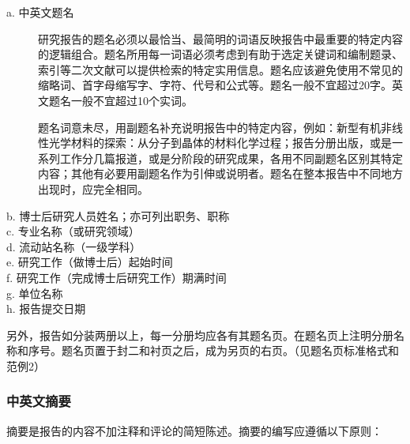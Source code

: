 \begin{description}

\item[a. 中英文题名]

研究报告的题名必须以最恰当、最简明的词语反映报告中最重要的特定内容的逻辑组合。题名所用每一词语必须考虑到有助于选定关键词和编制题录、索引等二次文献可以提供检索的特定实用信息。题名应该避免使用不常见的缩略词、首字母缩写字、字符、代号和公式等。题名一般不宜超过20字。英文题名一般不宜超过10个实词。

题名词意未尽，用副题名补充说明报告中的特定内容，例如：新型有机非线性光学材料的探索：从分子到晶体的材料化学过程；报告分册出版，或是一系列工作分几篇报道，或是分阶段的研究成果，各用不同副题名区别其特定内容；其他有必要用副题名作为引伸或说明者。题名在整本报告中不同地方出现时，应完全相同。

\item[b. 博士后研究人员姓名；亦可列出职务、职称]

\item[c. 专业名称（或研究领域）]

\item[d. 流动站名称（一级学科）]

\item[e. 研究工作（做博士后）起始时间]

\item[f. 研究工作（完成博士后研究工作）期满时间]

\item[g. 单位名称]

\item[h. 报告提交日期]

\end{description}

另外，报告如分装两册以上，每一分册均应各有其题名页。在题名页上注明分册名称和序号。题名页置于封二和衬页之后，成为另页的右页。（见题名页标准格式和范例2）


\subsubsection{中英文摘要}

摘要是报告的内容不加注释和评论的简短陈述。摘要的编写应遵循以下原则：


